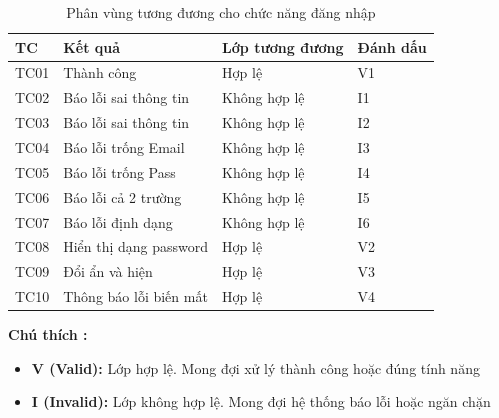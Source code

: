 \begin{table}[H]
	\centering
	\small
	\renewcommand{\arraystretch}{1.25}
	\setlength{\tabcolsep}{5pt}
	\begin{tabularx}{\textwidth}{|>{\centering\arraybackslash}p{1.6cm}|>{\raggedright\arraybackslash}X|>{\centering\arraybackslash}p{3.0cm}|>{\centering\arraybackslash}p{2.1cm}|}
		\hline
		\textbf{TC} & \textbf{Kết quả}       & \textbf{Lớp tương đương} & \textbf{Đánh dấu} \\
		\hline
		TC01        & Thành công             & Hợp lệ                   & V1                \\
		\hline
		TC02        & Báo lỗi sai thông tin  & Không hợp lệ             & I1                \\
		\hline
		TC03        & Báo lỗi sai thông tin  & Không hợp lệ             & I2                \\
		\hline
		TC04        & Báo lỗi trống Email    & Không hợp lệ             & I3                \\
		\hline
		TC05        & Báo lỗi trống Pass     & Không hợp lệ             & I4                \\
		\hline
		TC06        & Báo lỗi cả 2 trường    & Không hợp lệ             & I5                \\
		\hline
		TC07        & Báo lỗi định dạng      & Không hợp lệ             & I6                \\
		\hline
		TC08        & Hiển thị dạng password & Hợp lệ                   & V2                \\
		\hline
		TC09        & Đổi ẩn và hiện         & Hợp lệ                   & V3                \\
		\hline
		TC10        & Thông báo lỗi biến mất & Hợp lệ                   & V4                \\
		\hline
	\end{tabularx}
	\caption{Phân vùng tương đương cho chức năng đăng nhập}
\end{table}

\textbf{Chú thích :}
\begin{itemize}
	\item \textbf{V (Valid):} Lớp hợp lệ. Mong đợi xử lý thành công hoặc đúng tính năng
	\item \textbf{I (Invalid):} Lớp không hợp lệ. Mong đợi hệ thống báo lỗi hoặc ngăn chặn
\end{itemize}

